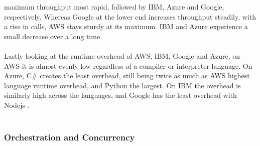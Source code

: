 \documentclass[a4paper,twoside,11pt, pagesize]{scrartcl}
\begin{document}
\begin{spacing}{1.2}
maximum throughput most rapid, followed by IBM, Azure and Google, respectively. Whereas Google at the lower end increases throughput steadily, with a rise in calls, AWS stays sturdy at its maximum. IBM and Azure experience a small decrease over a long time.\\\\ Lastly looking at the runtime overhead of AWS, IBM, Google and Azure, on AWS it is almost evenly low regardless of a compiler or interpreter language. On Azure, C\# creates the least overhead, still being twice as much as AWS highest language runtime overhead, and Python the largest. On IBM the overhead is similarly high across the languages, and Google has the least overhead with Nodejs \cite{pawlik2019performance}.\\\\ 
\subsubsection{Orchestration and Concurrency}

\end{spacing}
\end{document}
